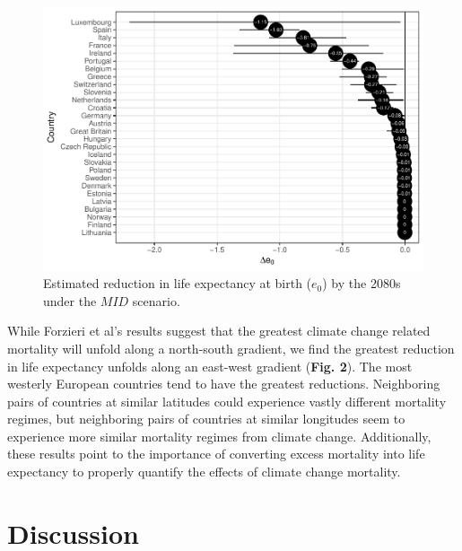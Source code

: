 \documentclass[12pt,]{article}
\makeatletter
\def\maxwidth{\ifdim\Gin@nat@width>\linewidth\linewidth
\else\Gin@nat@width\fi}
\let\Oldincludegraphics\includegraphics
\renewcommand{\includegraphics}[1]{\Oldincludegraphics[width=\maxwidth]{#1}}
\makeatother
\begin{document}
\begin{figure}
\centering
\includegraphics{MS-cclifeexpec_files/figure-latex/unnamed-chunk-2-1.pdf}
\caption{Estimated reduction in life expectancy at birth (\(e_0\)) by
the 2080s under the \(MID\) scenario.}
\end{figure}

While Forzieri et al's \citep{forzieri2017increasing} results suggest
that the greatest climate change related mortality will unfold along a
north-south gradient, we find the greatest reduction in life expectancy
unfolds along an east-west gradient (\textbf{Fig. 2}). The most westerly
European countries tend to have the greatest reductions. Neighboring
pairs of countries at similar latitudes could experience vastly
different mortality regimes, but neighboring pairs of countries at
similar longitudes seem to experience more similar mortality regimes
from climate change. Additionally, these results point to the importance
of converting excess mortality into life expectancy to properly quantify
the effects of climate change mortality.

\section{Discussion}\label{discussion}
\end{document}
